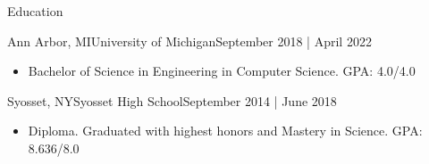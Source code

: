 \documentclass[]{mcdowellcv}
\begin{document}
    \makeheader
          

    \begin{cvsection}{Education}
        \begin{cvsubsection}{Ann Arbor, MI}{University of Michigan}{September 2018 | April 2022}
            \begin{itemize}
                \item 
                    Bachelor of Science in Engineering in Computer Science. 
                    \hfill {GPA: 4.0/4.0}
                    \vspace*{-4pt}
            \end{itemize}
        \end{cvsubsection}
        \begin{cvsubsection}{Syosset, NY}{Syosset High School}{September 2014 | June 2018}
            \begin{itemize}
                \item 
                    Diploma. Graduated with highest honors and Mastery in Science.
                    \hfill {GPA: 8.636/8.0}
                    \vspace*{-4pt}
            \end{itemize}
        \end{cvsubsection}
    \end{cvsection}
\end{document}

